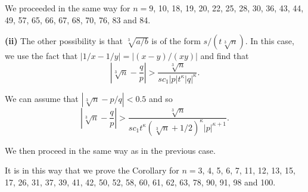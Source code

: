 \documentclass{jT}
\theoremstyle{definition}
\begin{document}
We proceeded in the same way for $n=9$, 10, 18, 19, 20, 22, 25, 28, 30, 36, 43, 44, 49, 57,
65, 66, 67, 68, 70, 76, 83 and 84.

{\bf (ii)} The other possibility is that $\sqrt[3]{a/b}$ is of 
the form $s/(t\sqrt[3]{n})$. In this case, we use 
the fact that $|1/x-1/y|= |(x-y)/(xy)|$ and find that 
\begin{displaymath}
\left| \sqrt[3]{n} - \frac{q}{p} \right| 
> \frac{\sqrt[3]{n}}{sc_{1}|p|t^{\kappa}|q|^{\kappa}}. 
\end{displaymath}

We can assume that $|\sqrt[3]{n}-p/q| < 0.5$ and so 
\begin{displaymath}
\left| \sqrt[3]{n} - \frac{q}{p} \right| 
> \frac{\sqrt[3]{n}}
       {sc_{1}t^{\kappa}(\sqrt[3]{n}+1/2)^{\kappa} |p|^{\kappa+1}}. 
\end{displaymath}

We then proceed in the same way as in the previous case. 

It is in this way that we prove the Corollary for $n=3$, 4, 
5, 6, 7, 11, 12, 13, 15, 17, 26, 31, 37, 39, 41, 42, 50, 52,
58, 60, 61, 62, 63, 78, 90, 91, 98 and 100.
\end{document}
